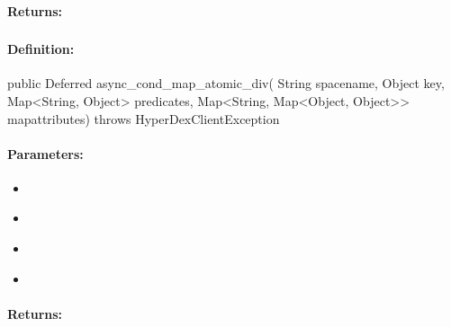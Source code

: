 \paragraph{Returns:}


\pagebreak
\subsubsection{}
\label{api:java:async_cond_map_atomic_div}


\paragraph{Definition:}
\begin{javacode}
public Deferred async_cond_map_atomic_div(
        String spacename,
        Object key,
        Map<String, Object> predicates,
        Map<String, Map<Object, Object>> mapattributes) throws HyperDexClientException
\end{javacode}

\paragraph{Parameters:}
\begin{itemize}[noitemsep]
\item {}\\

\item {}\\

\item {}\\

\item {}\\

\end{itemize}

\paragraph{Returns:}


